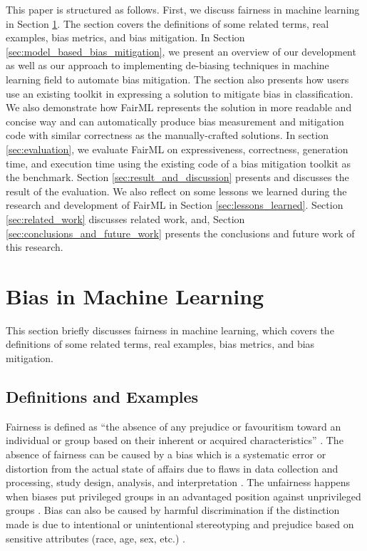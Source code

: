 \documentclass[sigconf,review]{acmart}
\begin{document}
	This paper is structured as follows. First, we discuss fairness in machine learning in Section \ref{sec:bias_in_machine_learning}. The section covers the definitions of some related terms, real examples, bias metrics, and bias mitigation. In Section \ref{sec:model_based_bias_mitigation}, we present an overview of our development as well as our approach to implementing de-biasing techniques in machine learning field to automate bias mitigation. 
	The section also presents how users use an existing toolkit in expressing a solution to mitigate bias in classification. We also demonstrate how FairML represents the solution in more readable and concise way and can automatically produce bias measurement and mitigation code with similar correctness as the manually-crafted solutions.
	In section \ref{sec:evaluation}, we evaluate FairML on expressiveness, correctness, generation time, and execution time using the existing code of a bias mitigation toolkit as the benchmark. Section \ref{sec:result_and_discussion} presents and discusses the result of the evaluation. 
	We also reflect on some lessons we learned during the research and development of FairML in Section \ref{sec:lessons_learned}. 
	Section \ref{sec:related_work} discusses related work, and, Section \ref{sec:conclusions_and_future_work} presents the conclusions and future work of this research.
	
	\section{Bias in Machine Learning}
	\label{sec:bias_in_machine_learning}
	This section briefly discusses fairness in machine learning, which covers the definitions of some related terms, real examples, bias metrics, and bias mitigation.
	
	\subsection{Definitions and Examples}
	\label{sec:definitions_and_examples}
	
	Fairness is defined as ``the absence of any prejudice or favouritism toward an individual or
	group based on their inherent or acquired characteristics'' \cite{mehrabi2021survey}.
	The absence of fairness can be caused by a bias which is a systematic error or distortion from the actual state of affairs due to flaws in data collection and processing, study design, analysis, and interpretation \cite{oxford2022bias}. 
	The unfairness happens when biases put privileged groups in an advantaged position against unprivileged groups \cite{bellamy2018ai}. 
	Bias can also be caused by harmful discrimination if the distinction made is due to intentional or unintentional stereotyping and prejudice based on sensitive attributes (race, age, sex, etc.) \cite{mehrabi2021survey,chen2019fairness}. 
	
\end{document}

